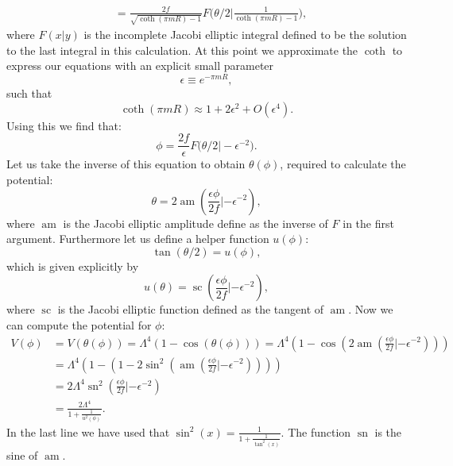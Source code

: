 \documentclass[master,       %
               twoside,        %
               BCOR10mm,       %
               english,ngerman, %
               ]{GAUBM}
\begin{document}
\begin{otherlanguage}{english}
\begin{align}
	&= \frac{2 f}{\sqrt{\coth(\pi mR) - 1}} F\big(\theta / 2 \big| \frac{1}{\coth(\pi mR) - 1}\big),
\end{align}
where $F(x|y)$ is the incomplete Jacobi elliptic integral defined to be the solution to the last integral in this calculation.
At this point we approximate the $\coth$ to express our equations with an explicit small parameter
\begin{equation}
	\epsilon \equiv e^{-\pi m R},
\end{equation}
such that
\begin{equation}
	\coth(\pi m R) \approx 1 + 2 \epsilon^2 + O(\epsilon^4).
\end{equation}
Using this we find that:
\begin{equation}
	\phi = \frac{2 f}{\epsilon} F\big(\theta / 2 \big| - \epsilon^{-2} \big).
\end{equation}
Let us take the inverse of this equation to obtain $\theta(\phi)$, required to calculate the potential:
\begin{equation}
	\theta = 2 \operatorname{am}\left(\frac{\epsilon \phi}{2 f} | - \epsilon^{-2}\right),
\end{equation}
where $\operatorname{am}$ is the Jacobi elliptic amplitude define as the inverse of $F$ in the first argument.
Furthermore let us define a helper function $u(\phi)$:
\begin{equation}
	\tan(\theta / 2) = u(\phi),
\end{equation}
which is given explicitly by
\begin{equation}
	u(\theta) = \operatorname{sc}(\frac{\epsilon \phi}{2 f} | - \epsilon^{-2}),
\end{equation}
where $\operatorname{sc}$ is the Jacobi elliptic function defined as the tangent of $\operatorname{am}$.
Now we can compute the potential for $\phi$:
\begin{align}
	V(\phi) &= V(\theta(\phi)) = \Lambda^4 (1 - \cos (\theta(\phi)))
	= \Lambda^4 ( 1 - \cos (2 \operatorname{am} ( \frac{\epsilon \phi}{2 f} | - \epsilon^{-2}) )) \nonumber \\
	&= \Lambda^4 ( 1 - (1 - 2 \sin^2( \operatorname{am}(\frac{\epsilon \phi}{2 f} | - \epsilon^{-2})))) \nonumber \\
	&= 2 \Lambda^4 \operatorname{sn}^2 ( \frac{\epsilon \phi}{2 f} | - \epsilon^{-2} ) \nonumber \\
	&= \frac{2 \Lambda^4}{1 + \frac{1}{u^2(\phi)}}.
\end{align}
In the last line we have used that $\sin^2(x) = \frac{1}{1 + \frac{1}{\tan^2(x)}}$. The function $\operatorname{sn}$ is the sine of $\operatorname{am}$.

\end{otherlanguage}
\end{document}
